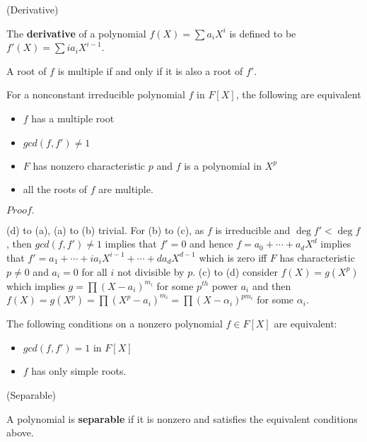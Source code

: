 \documentclass{article}
\newcommand{\Pf}[1]{$Proof.$\par}
\begin{document}
\begin{definition}
    (Derivative)\par
    The \textbf{derivative} of a polynomial $f(X) = \sum a_iX^i$ is defined to be $f'(X) = \sum ia_iX^{i-1}$.
\end{definition}

\begin{lemma}
    A root of $f$ is multiple if and only if it is also a root of $f'$.
\end{lemma}

\begin{proposition}
    For a nonconstant irreducible polynomial $f$ in $F[X]$, the following are equivalent
    \begin{itemize}
        \item $f$ has a multiple root
        \item $gcd(f,f') \neq 1$
        \item $F$ has nonzero characteristic $p$ and $f$ is a polynomial in $X^p$
        \item all the roots of $f$ are multiple.
    \end{itemize}
\end{proposition}
\Pf\par
    (d) to (a), (a) to (b) trivial. For (b) to (c), as $f$ is irreducible and $\deg f' < \deg  f$, then $gcd(f,f') \neq 1$ implies that $f' = 0$ and hence $f = a_0 + \cdots + a_dX^d$ implies that $f' = a_1 + \cdots + ia_i X^{i-1} + \cdots + da_dX^{d-1}$ which is zero iff $F$ has characteristic $p \neq 0$ and $a_i = 0$ for all $i$ not divisible by $p$. (c) to (d) consider $f(X) = g(X^p)$ which implies $g = \prod (X-a_i)^{m_i}$ for some $p^{th}$ power $a_i$ and then $f(X) = g(X^p) = \prod (X^p - a_i)^{m_i} = \prod (X-\alpha_i)^{pm_i}$ for some $\alpha_i$.

\begin{proposition}
    The following conditions on a nonzero polynomial $f\in F[X]$ are equivalent:
    \begin{itemize}
        \item $gcd(f,f') = 1$ in $F[X]$
        \item $f$ has only simple roots.
    \end{itemize}
\end{proposition}

\begin{definition}
    (Separable)\par
    A polynomial is \textbf{separable} if it is nonzero and satisfies the equivalent conditions above.
\end{definition}
\end{document}
